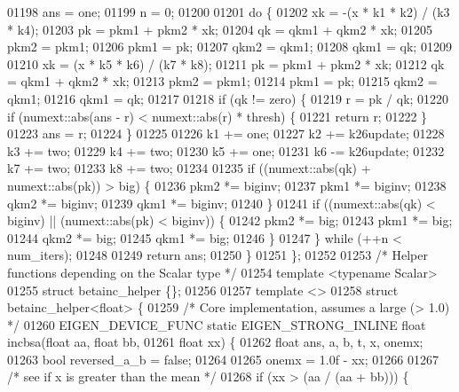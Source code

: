 \begin{DoxyCode}
01198     ans = one;
01199     n = 0;
01200 
01201     \textcolor{keywordflow}{do} \{
01202       xk = -(x * k1 * k2) / (k3 * k4);
01203       pk = pkm1 + pkm2 * xk;
01204       qk = qkm1 + qkm2 * xk;
01205       pkm2 = pkm1;
01206       pkm1 = pk;
01207       qkm2 = qkm1;
01208       qkm1 = qk;
01209 
01210       xk = (x * k5 * k6) / (k7 * k8);
01211       pk = pkm1 + pkm2 * xk;
01212       qk = qkm1 + qkm2 * xk;
01213       pkm2 = pkm1;
01214       pkm1 = pk;
01215       qkm2 = qkm1;
01216       qkm1 = qk;
01217 
01218       \textcolor{keywordflow}{if} (qk != zero) \{
01219         r = pk / qk;
01220         \textcolor{keywordflow}{if} (numext::abs(ans - r) < numext::abs(r) * thresh) \{
01221           \textcolor{keywordflow}{return} r;
01222         \}
01223         ans = r;
01224       \}
01225 
01226       k1 += one;
01227       k2 += k26update;
01228       k3 += two;
01229       k4 += two;
01230       k5 += one;
01231       k6 -= k26update;
01232       k7 += two;
01233       k8 += two;
01234 
01235       \textcolor{keywordflow}{if} ((numext::abs(qk) + numext::abs(pk)) > big) \{
01236         pkm2 *= biginv;
01237         pkm1 *= biginv;
01238         qkm2 *= biginv;
01239         qkm1 *= biginv;
01240       \}
01241       \textcolor{keywordflow}{if} ((numext::abs(qk) < biginv) || (numext::abs(pk) < biginv)) \{
01242         pkm2 *= big;
01243         pkm1 *= big;
01244         qkm2 *= big;
01245         qkm1 *= big;
01246       \}
01247     \} \textcolor{keywordflow}{while} (++n < num\_iters);
01248 
01249     \textcolor{keywordflow}{return} ans;
01250   \}
01251 \};
01252 
01253 \textcolor{comment}{/* Helper functions depending on the Scalar type */}
01254 \textcolor{keyword}{template} <\textcolor{keyword}{typename} Scalar>
01255 \textcolor{keyword}{struct }betainc\_helper \{\};
01256 
01257 \textcolor{keyword}{template} <>
01258 \textcolor{keyword}{struct }betainc\_helper<float> \{
01259   \textcolor{comment}{/* Core implementation, assumes a large (> 1.0) */}
01260   EIGEN\_DEVICE\_FUNC \textcolor{keyword}{static} EIGEN\_STRONG\_INLINE \textcolor{keywordtype}{float} incbsa(\textcolor{keywordtype}{float} aa, \textcolor{keywordtype}{float} bb,
01261                                                             \textcolor{keywordtype}{float} xx) \{
01262     \textcolor{keywordtype}{float} ans, a, b, t, x, onemx;
01263     \textcolor{keywordtype}{bool} reversed\_a\_b = \textcolor{keyword}{false};
01264 
01265     onemx = 1.0f - xx;
01266 
01267     \textcolor{comment}{/* see if x is greater than the mean */}
01268     \textcolor{keywordflow}{if} (xx > (aa / (aa + bb))) \{

\end{DoxyCode}
